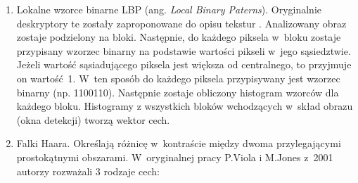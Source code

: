 \begin{enumerate}

\item Lokalne wzorce binarne LBP (ang. \textit{Local Binary Paterns}).
Oryginalnie deskryptory te zostały zaproponowane  do opisu tekstur \cite{ojala2002multiresolution}. %
Analizowany obraz zostaje podzielony na bloki.
Następnie, do każdego piksela w~bloku zostaje przypisany wzorzec binarny na podstawie wartości pikseli w~jego sąsiedztwie.
Jeżeli wartość sąsiadującego piksela jest większa od centralnego, to przyjmuje on wartość~1. 
W~ten sposób do każdego piksela przypisywany jest wzorzec binarny (np. 1100110). %
Następnie zostaje obliczony histogram wzorców dla każdego bloku.
Histogramy z wszystkich bloków wchodzących w~skład obrazu (okna detekcji) tworzą wektor cech.

\item Falki Haara.
Określają różnicę w~kontraście między dwoma przylegającymi prostokątnymi obszarami. 
W~oryginalnej pracy P.Viola i M.Jones z~2001 \cite{viola2001rapid} autorzy rozważali 3 rodzaje cech: 


\end{enumerate}
